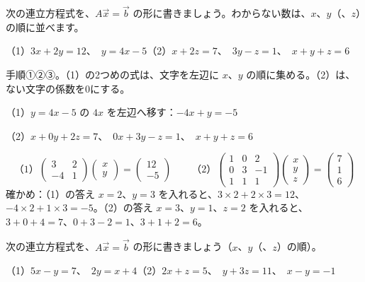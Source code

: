 \begin{reidai}[連立方程式を行列で書く]
次の連立方程式を、$A\vec x=\vec b$ の形に書きましょう。わからない数は、$x$、$y$（、$z$）の順に並べます。\par
（1）$3x+2y=12$、\ $y=4x-5$\newline （2）$x+2z=7$、\ $3y-z=1$、\ $x+y+z=6$\par
\kangaekata 手順①②③。（1）の2つめの式は、文字を左辺に $x$、$y$ の順に集める。（2）は、ない文字の係数を0にする。\par
\shiki\kviibs{}\zw{} （1）$y=4x-5$ の $4x$ を左辺へ移す：$-4x+y=-5$\par
\kviiba （2）$x+0y+2z=7$、\ $0x+3y-z=1$、\ $x+y+z=6$\par
\kotae
\[ \text{（1）}\begin{pmatrix} 3 & 2\\ -4 & 1 \end{pmatrix}\begin{pmatrix} x\\ y \end{pmatrix}=\begin{pmatrix} 12\\ -5 \end{pmatrix}\qquad \text{（2）}\begin{pmatrix} 1 & 0 & 2\\ 0 & 3 & -1\\ 1 & 1 & 1 \end{pmatrix}\begin{pmatrix} x\\ y\\ z \end{pmatrix}=\begin{pmatrix} 7\\ 1\\ 6 \end{pmatrix} \]
\kviiba 確かめ：（1）の答え $x=2$、$y=3$ を入れると、$3\times2+2\times3=12$、$-4\times2+1\times3=-5$。（2）の答え $x=3$、$y=1$、$z=2$ を入れると、$3+0+4=7$、$0+3-2=1$、$3+1+2=6$。
\end{reidai}

\begin{jibun}
次の連立方程式を、$A\vec x=\vec b$ の形に書きましょう（$x$、$y$（、$z$）の順）。\par
（1）$5x-y=7$、\ $2y=x+4$\newline （2）$2x+z=5$、\ $y+3z=11$、\ $x-y=-1$
\end{jibun}

